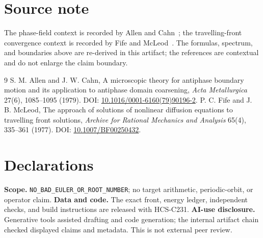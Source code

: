 \documentclass[10pt]{article}
\begin{document}
\enlargethispage{4\baselineskip}
\section*{Source note}
The phase-field context is recorded by Allen and Cahn~\cite{allen}; the
travelling-front convergence context is recorded by Fife and McLeod~\cite{fife}.
The formulas, spectrum, and boundaries above are re-derived in this artifact;
the references are contextual and do not enlarge the claim boundary.

\begin{thebibliography}{9}\small
\setlength{\itemsep}{0pt}\setlength{\parskip}{0pt}\setlength{\parsep}{0pt}
 S. M. Allen and J. W. Cahn, A microscopic theory for
antiphase boundary motion and its application to antiphase domain coarsening,
\emph{Acta Metallurgica} 27(6), 1085--1095 (1979).
DOI: \href{https://doi.org/10.1016/0001-6160(79)90196-2}{10.1016/0001-6160(79)90196-2}.
 P. C. Fife and J. B. McLeod, The approach of solutions of
nonlinear diffusion equations to travelling front solutions, \emph{Archive for
Rational Mechanics and Analysis} 65(4), 335--361 (1977).
DOI: \href{https://doi.org/10.1007/BF00250432}{10.1007/BF00250432}.
\end{thebibliography}

\clearpage
\section*{Declarations}
\textbf{Scope.} \texttt{NO\_BAD\_EULER\_OR\_ROOT\_NUMBER}; no target arithmetic,
periodic-orbit, or operator claim. \textbf{Data and code.} The exact front,
energy ledger, independent checks, and build instructions are released with
HCS-C231. \textbf{AI-use disclosure.} Generative tools assisted drafting and
code generation; the internal artifact chain checked displayed claims and
metadata. This is not external peer review.
\end{document}
